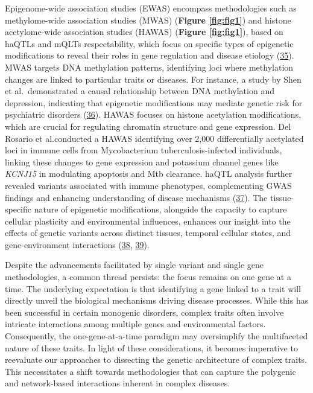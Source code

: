 Epigenome-wide association studies (EWAS) encompass methodologies such as methylome-wide association studies (MWAS) (\textbf{Figure \ref{fig:fig1}}) and histone acetylome-wide association studies (HAWAS) (\textbf{Figure \ref{fig:fig1}}), based on haQTLs and mQLTs respectability, which focus on specific types of epigenetic modifications to reveal their roles in gene regulation and disease etiology (\protect\hyperlink{ref-TPqvAJda}{35}).
MWAS targets DNA methylation patterns, identifying loci where methylation changes are linked to particular traits or diseases.
For instance, a study by Shen et al.~demonstrated a causal relationship between DNA methylation and depression, indicating that epigenetic modifications may mediate genetic risk for psychiatric disorders (\protect\hyperlink{ref-1DNxNkLsT}{36}).
HAWAS focuses on histone acetylation modifications, which are crucial for regulating chromatin structure and gene expression.
Del Rosario et al.conducted a HAWAS identifying over 2,000 differentially acetylated loci in immune cells from Mycobacterium tuberculosis-infected individuals, linking these changes to gene expression and potassium channel genes like \emph{KCNJ15} in modulating apoptosis and Mtb clearance.
haQTL analysis further revealed variants associated with immune phenotypes, complementing GWAS findings and enhancing understanding of disease mechanisms (\protect\hyperlink{ref-1BYHeZlgB}{37}).
The tissue-specific nature of epigenetic modifications, alongside the capacity to capture cellular plasticity and environmental influences, enhances our insight into the effects of genetic variants across distinct tissues, temporal cellular states, and gene-environment interactions (\protect\hyperlink{ref-FeaSnwhX}{38}, \protect\hyperlink{ref-KfWCLspO}{39}).

Despite the advancements facilitated by single variant and single gene methodologies, a common thread persists: the focus remains on one gene at a time.
The underlying expectation is that identifying a gene linked to a trait will directly unveil the biological mechanisms driving disease processes.
While this has been successful in certain monogenic disorders, complex traits often involve intricate interactions among multiple genes and environmental factors.
Consequently, the one-gene-at-a-time paradigm may oversimplify the multifaceted nature of these traits.
In light of these considerations, it becomes imperative to reevaluate our approaches to dissecting the genetic architecture of complex traits.
This necessitates a shift towards methodologies that can capture the polygenic and network-based interactions inherent in complex diseases.

